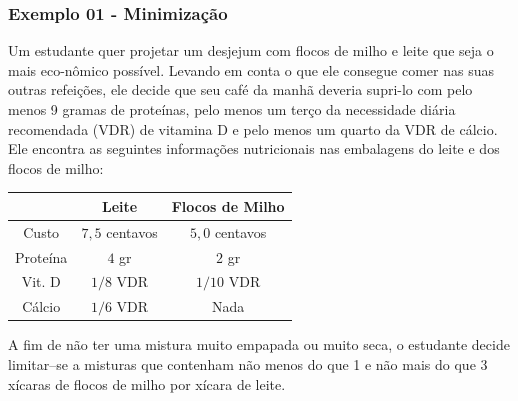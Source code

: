 \documentclass[hyperref={pdfpagelabels=false}]{beamer}
\begin{document}
\begin{frame}
\frametitle{Exemplo 01 - Minimização}

Um estudante quer projetar um desjejum com flocos de milho e leite que seja o mais eco-nômico possível. Levando em conta o que ele consegue comer nas suas outras refeições, ele decide que seu café da manhã deveria supri-lo com pelo menos 9 gramas de proteínas, pelo menos um terço da necessidade diária recomendada (VDR) de vitamina D e pelo menos um quarto da VDR de cálcio. Ele encontra as seguintes informações nutricionais nas embalagens do leite e dos flocos de milho:

\begin{table}[h]
	\centering
	\begin{tabular}{ccc}
		\hline
				&	Leite 	&	Flocos de Milho \\
		\hline
		Custo	&	$7,5$ centavos	&	$5,0$ centavos \\
		Proteína &	$4$ gr	&	$2$ gr 	\\
		Vit. D	&	$1/8$ VDR	&	$1/10$ VDR 	\\
		Cálcio	&	$1/6$ VDR	&	Nada	\\
		\hline
	\end{tabular}
\end{table}
A fim de não ter uma mistura muito empapada ou muito seca, o estudante decide limitar--se a misturas que contenham não menos do que 1 e não mais do que 3 xícaras de flocos de milho por xícara de leite. 

\end{frame}
\end{document}

